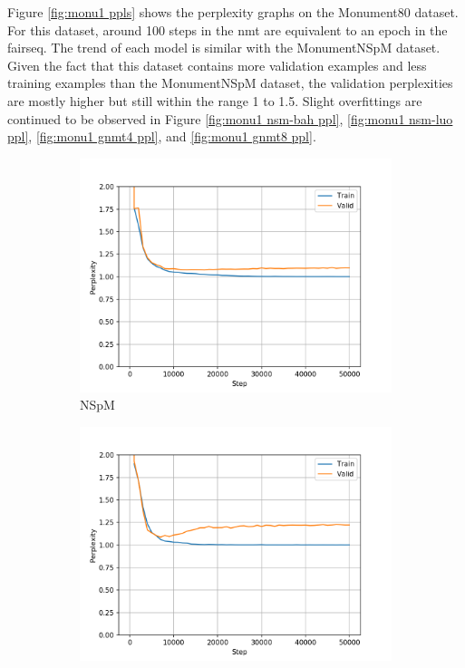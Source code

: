 Figure \ref{fig:monu1 ppls} shows the perplexity graphs on the Monument80 dataset. For this dataset, around 100 steps in the nmt are equivalent to an epoch in the fairseq. The trend of each model is similar with the MonumentNSpM dataset. Given the fact that this dataset contains more validation examples and less training examples than the MonumentNSpM dataset, the validation perplexities are mostly higher but still within the range 1 to 1.5. Slight overfittings are continued to be observed in Figure \ref{fig:monu1 nsm-bah ppl}, \ref{fig:monu1 nsm-luo ppl}, \ref{fig:monu1 gnmt4 ppl}, and \ref{fig:monu1 gnmt8 ppl}.
\begin{figure}[H]
\centering
\begin{subfigure}{0.45\textwidth}
\includegraphics[width=\textwidth]{../results/monument_600/run1/neural_sparql_machine/ppls.png} 
\caption{NSpM}
\label{fig:monu600 nsm ppl}
\end{subfigure}
\hfill
\begin{subfigure}{0.45\textwidth}
\includegraphics[width=\textwidth]{../results/monument_600/run1/neural_sparql_machine_bahdanau_attention/ppls.png}

\end{subfigure}
\end{figure}

